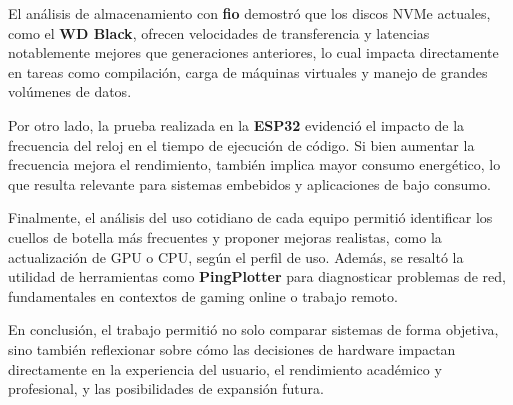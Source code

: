 \documentclass[a4paper,12pt]{article}
\begin{document}
El análisis de almacenamiento con \textbf{fio} demostró que los discos NVMe actuales, como el \textbf{WD Black}, ofrecen velocidades de transferencia y latencias notablemente mejores que generaciones anteriores, lo cual impacta directamente en tareas como compilación, carga de máquinas virtuales y manejo de grandes volúmenes de datos.

Por otro lado, la prueba realizada en la \textbf{ESP32} evidenció el impacto de la frecuencia del reloj en el tiempo de ejecución de código. Si bien aumentar la frecuencia mejora el rendimiento, también implica mayor consumo energético, lo que resulta relevante para sistemas embebidos y aplicaciones de bajo consumo.

Finalmente, el análisis del uso cotidiano de cada equipo permitió identificar los cuellos de botella más frecuentes y proponer mejoras realistas, como la actualización de GPU o CPU, según el perfil de uso. Además, se resaltó la utilidad de herramientas como \textbf{PingPlotter} para diagnosticar problemas de red, fundamentales en contextos de gaming online o trabajo remoto.

En conclusión, el trabajo permitió no solo comparar sistemas de forma objetiva, sino también reflexionar sobre cómo las decisiones de hardware impactan directamente en la experiencia del usuario, el rendimiento académico y profesional, y las posibilidades de expansión futura.
\end{document}
